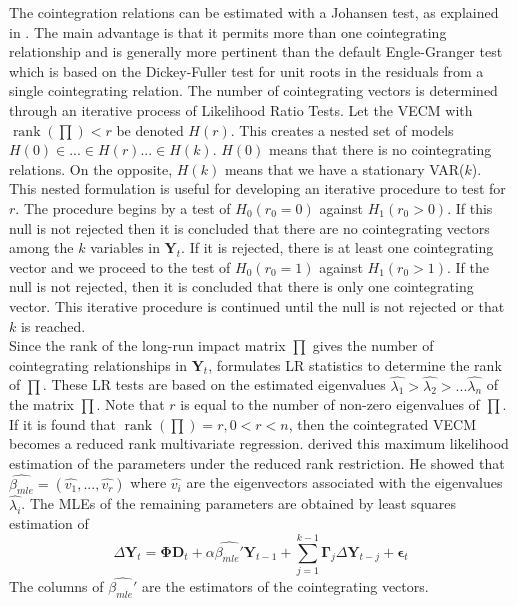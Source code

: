 \documentclass[11pt,a4,twosided,singlespacing,titlepagenumber=on]{scrreprt}
\numberwithin{equation}{chapter} %
\theoremstyle{remark}
\DeclareMathOperator{\rank}{rank}
\newcommand{\matr}[1]{\mathbf{#1}}
\begin{document}
The cointegration relations can be estimated with a Johansen test, as explained in \cite{johansen1988}. The main advantage is that it permits more than one cointegrating relationship and is generally more pertinent than the default Engle-Granger test which is based on the Dickey-Fuller test for unit roots in the residuals from a single cointegrating relation. The number of cointegrating vectors is determined through an iterative process of Likelihood Ratio Tests. Let the VECM with $\rank\left(\prod\right)<r$ be denoted $H(r)$. This creates a nested set of models $H(0) \in ... \in H(r) ... \in H(k)$. $H(0)$ means that there is no cointegrating relations. On the opposite, $H(k)$ means that we have a stationary VAR($k$). This nested formulation is useful for developing an iterative procedure to test for $r$. The procedure begins by a test of $H_0(r_0 = 0)$ against $H_1(r_0 > 0)$. If this null is not rejected then it is concluded that there are no cointegrating vectors among the $k$ variables in $\matr{Y}_t$. If it is rejected, there is at least one cointegrating vector and we proceed to the test of $H_0(r_0 = 1)$ against $H_1(r_0 > 1)$. If the null is not rejected, then it is concluded that there is only one cointegrating vector. This iterative procedure is continued until the null is not rejected or that $k$ is reached. \\


Since the rank of the long-run impact matrix $\prod$ gives the number of cointegrating relationships in $\matr{Y}_t$, \cite{johansen1988} formulates LR statistics to determine the rank of $\prod$. These LR tests are based on the estimated eigenvalues $\hat{\lambda_1} > \hat{\lambda_2} > ... \hat{\lambda_n}$ of the matrix $\prod$. Note that $r$ is equal to the number of non-zero eigenvalues of $\prod$. If it is found that $\rank\left(\prod\right) = r, 0 < r < n$, then the cointegrated VECM becomes a reduced rank multivariate regression. \cite{johansen1988} derived this maximum likelihood estimation of the parameters under the reduced rank restriction. He showed that $\hat{\beta_{mle}} = (\hat{v_1},...,\hat{v_r})$ where $\hat{v_i}$ are the eigenvectors associated with the eigenvalues $\hat{\lambda_i}$. The MLEs of the remaining parameters are obtained by least squares estimation of
\begin{equation}
\Delta \matr{Y}_t = \matr{\Phi} \matr{D}_t + \alpha \hat{\beta_{mle}'} \matr{Y}_{t-1} + \sum_{j=1}^{k-1} \matr{\Gamma}_j \Delta \matr{Y}_{t-j} + \matr{\epsilon}_t
\end{equation}
The columns of $\hat{\beta_{mle}'}$ are the estimators of the cointegrating vectors. \\
\end{document}
